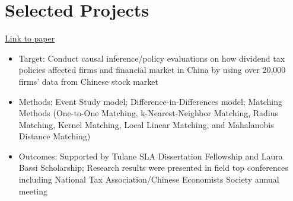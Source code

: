 \documentclass{resume}
\begin{document}
\section{Selected Projects}
\href{https://liberalarts.tulane.edu/sites/liberalarts.tulane.edu/files/sites/default/files/Xie%20JMP_0.pdf}{Link to paper}
\begin{itemize}
  \item Target: Conduct causal inference/policy evaluations on how dividend tax policies affected firms and financial market in China by using over 20,000 firms' data from Chinese stock market 
  \item Methods: Event Study model; Difference-in-Differences model; Matching Methods (One-to-One Matching, k-Nearest-Neighbor Matching, Radius Matching, Kernel Matching, Local Linear Matching, and Mahalanobis Distance Matching)
  \item Outcomes: Supported by Tulane SLA Dissertation Fellowship and Laura Bassi Scholarship; Research results were presented in field top conferences including National Tax Association/Chinese Economists Society annual meeting
\end{itemize}
\end{document}
